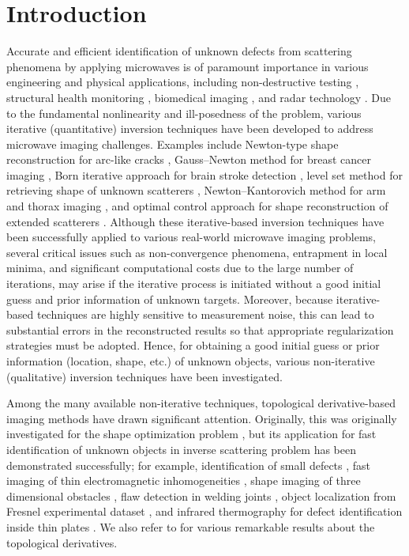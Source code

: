 \documentclass[a4,10pt]{article}
\theoremstyle{plain}
\theoremstyle{remark}
\begin{document}
\section{Introduction}\label{sec:1}
Accurate and efficient identification of unknown defects from scattering phenomena by applying microwaves is of paramount importance in various engineering and physical applications, including non-destructive testing \cite{HRMGAC,PGBM,WWXHSZLF}, structural health monitoring \cite{CM2,HSM2,IV}, biomedical imaging \cite{A1,A2,CZBN}, and radar technology \cite{BMKS,C2,TKNN}. Due to the fundamental nonlinearity and ill-posedness of the problem, various iterative (quantitative) inversion techniques have been developed to address microwave imaging challenges. Examples include Newton-type shape reconstruction for arc-like cracks \cite{K}, Gauss–Newton method for breast cancer imaging \cite{RMMP}, Born iterative approach for brain stroke detection \cite{IBA}, level set method for retrieving shape of unknown scatterers \cite{DL}, Newton–Kantorovich method for arm and thorax imaging \cite{MJBB}, and optimal control approach for shape reconstruction of extended scatterers \cite{AGJKLY}. Although these iterative-based inversion techniques have been successfully applied to various real-world microwave imaging problems, several critical issues such as non-convergence phenomena, entrapment in local minima, and significant computational costs due to the large number of iterations, may arise if the iterative process is initiated without a good initial guess and prior information of unknown targets. Moreover, because iterative-based techniques are highly sensitive to measurement noise, this can lead to substantial errors in the reconstructed results so that appropriate regularization strategies must be adopted. Hence, for obtaining a good initial guess or prior information (location, shape, etc.) of unknown objects, various non-iterative (qualitative) inversion techniques have been investigated.

Among the many available non-iterative techniques, topological derivative-based imaging methods have drawn significant attention. Originally, this was originally investigated for the shape optimization problem \cite{ASSS,CR1,CGGM,EKS,NS,SZ}, but its application for fast identification of unknown objects in inverse scattering problem has been demonstrated successfully; for example, identification of small defects \cite{B1,BGN}, fast imaging of thin electromagnetic inhomogeneities \cite{P-TD3,P-TD1}, shape imaging of three dimensional obstacles \cite{LR1}, flaw detection in welding joints \cite{MR}, object localization from Fresnel experimental dataset \cite{CPR}, and infrared thermography for defect identification inside thin plates \cite{PR}. We also refer to \cite{AGJK,BHR,CDLR,CR3,HKO} for various remarkable results about the topological derivatives.
\end{document}
